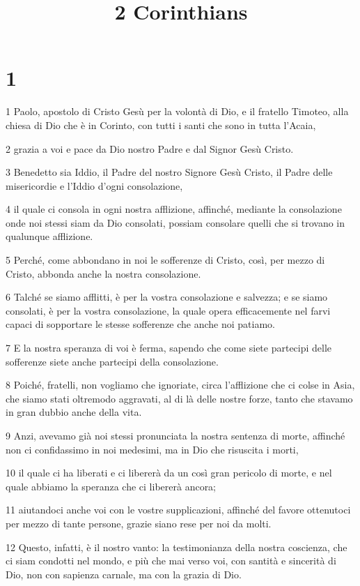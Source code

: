 

\title{2 Corinthians}


\chapter{1}

\par 1 Paolo, apostolo di Cristo Gesù per la volontà di Dio, e il fratello Timoteo, alla chiesa di Dio che è in Corinto, con tutti i santi che sono in tutta l'Acaia,
\par 2 grazia a voi e pace da Dio nostro Padre e dal Signor Gesù Cristo.
\par 3 Benedetto sia Iddio, il Padre del nostro Signore Gesù Cristo, il Padre delle misericordie e l'Iddio d'ogni consolazione,
\par 4 il quale ci consola in ogni nostra afflizione, affinché, mediante la consolazione onde noi stessi siam da Dio consolati, possiam consolare quelli che si trovano in qualunque afflizione.
\par 5 Perché, come abbondano in noi le sofferenze di Cristo, così, per mezzo di Cristo, abbonda anche la nostra consolazione.
\par 6 Talché se siamo afflitti, è per la vostra consolazione e salvezza; e se siamo consolati, è per la vostra consolazione, la quale opera efficacemente nel farvi capaci di sopportare le stesse sofferenze che anche noi patiamo.
\par 7 E la nostra speranza di voi è ferma, sapendo che come siete partecipi delle sofferenze siete anche partecipi della consolazione.
\par 8 Poiché, fratelli, non vogliamo che ignoriate, circa l'afflizione che ci colse in Asia, che siamo stati oltremodo aggravati, al di là delle nostre forze, tanto che stavamo in gran dubbio anche della vita.
\par 9 Anzi, avevamo già noi stessi pronunciata la nostra sentenza di morte, affinché non ci confidassimo in noi medesimi, ma in Dio che risuscita i morti,
\par 10 il quale ci ha liberati e ci libererà da un così gran pericolo di morte, e nel quale abbiamo la speranza che ci libererà ancora;
\par 11 aiutandoci anche voi con le vostre supplicazioni, affinché del favore ottenutoci per mezzo di tante persone, grazie siano rese per noi da molti.
\par 12 Questo, infatti, è il nostro vanto: la testimonianza della nostra coscienza, che ci siam condotti nel mondo, e più che mai verso voi, con santità e sincerità di Dio, non con sapienza carnale, ma con la grazia di Dio.
